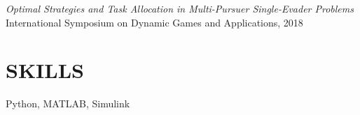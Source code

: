 \documentclass[margin, 10pt]{res} %
\newcommand{\ak}[1]{\textcolor{blue}{#1}}
\begin{document}
\begin{resume}
{\sl Optimal Strategies and Task Allocation in Multi-Pursuer Single-Evader Problems}\\
International Symposium on Dynamic Games and Applications, 2018


\section{SKILLS}
Python, MATLAB, Simulink




%


\end{resume}
\end{document}
